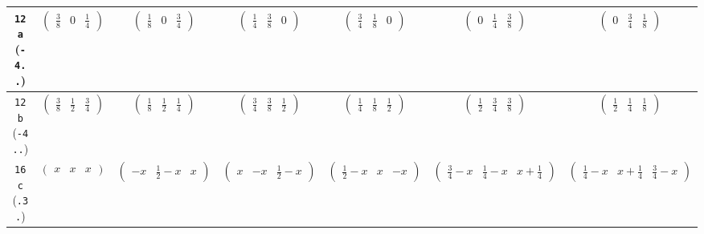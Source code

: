 \documentclass[fleqn,9pt,landscape]{jsarticle}
\begin{document}
\begin{center}
\begin{longtable}{ccccccc}
{\tt 12a} ({\tt -4..}) & $ \begin{pmatrix} \frac{3}{8} & 0 & \frac{1}{4} \end{pmatrix} $ & $ \begin{pmatrix} \frac{1}{8} & 0 & \frac{3}{4} \end{pmatrix} $ & $ \begin{pmatrix} \frac{1}{4} & \frac{3}{8} & 0 \end{pmatrix} $ & $ \begin{pmatrix} \frac{3}{4} & \frac{1}{8} & 0 \end{pmatrix} $ & $ \begin{pmatrix} 0 & \frac{1}{4} & \frac{3}{8} \end{pmatrix} $ & $ \begin{pmatrix} 0 & \frac{3}{4} & \frac{1}{8} \end{pmatrix} $ \\ \hline
{\tt 12b} ({\tt -4..}) & $ \begin{pmatrix} \frac{3}{8} & \frac{1}{2} & \frac{3}{4} \end{pmatrix} $ & $ \begin{pmatrix} \frac{1}{8} & \frac{1}{2} & \frac{1}{4} \end{pmatrix} $ & $ \begin{pmatrix} \frac{3}{4} & \frac{3}{8} & \frac{1}{2} \end{pmatrix} $ & $ \begin{pmatrix} \frac{1}{4} & \frac{1}{8} & \frac{1}{2} \end{pmatrix} $ & $ \begin{pmatrix} \frac{1}{2} & \frac{3}{4} & \frac{3}{8} \end{pmatrix} $ & $ \begin{pmatrix} \frac{1}{2} & \frac{1}{4} & \frac{1}{8} \end{pmatrix} $ \\ \hline
{\tt 16c} ({\tt .3.}) & $ \begin{pmatrix} x & x & x \end{pmatrix} $ & $ \begin{pmatrix} - x & \frac{1}{2} - x & x \end{pmatrix} $ & $ \begin{pmatrix} x & - x & \frac{1}{2} - x \end{pmatrix} $ & $ \begin{pmatrix} \frac{1}{2} - x & x & - x \end{pmatrix} $ & $ \begin{pmatrix} \frac{3}{4} - x & \frac{1}{4} - x & x + \frac{1}{4} \end{pmatrix} $ & $ \begin{pmatrix} \frac{1}{4} - x & x + \frac{1}{4} & \frac{3}{4} - x \end{pmatrix} $ \\

\end{longtable}
\end{center}
\end{document}
